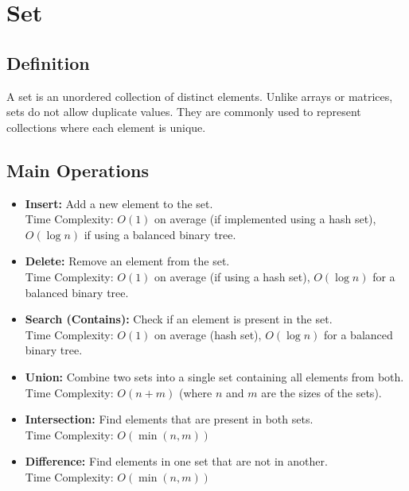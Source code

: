 \documentclass{article}
\begin{document}
\newpage

\section{Set}

\subsection{Definition}
A set is an unordered collection of distinct elements. Unlike arrays or matrices, sets do not allow duplicate values. They are commonly used to represent collections where each element is unique.

\subsection{Main Operations}
\begin{itemize}
    \item \textbf{Insert:} Add a new element to the set.\\
    Time Complexity: $O(1)$ on average (if implemented using a hash set), $O(\log n)$ if using a balanced binary tree.
    
    \item \textbf{Delete:} Remove an element from the set.\\
    Time Complexity: $O(1)$ on average (if using a hash set), $O(\log n)$ for a balanced binary tree.
    
    \item \textbf{Search (Contains):} Check if an element is present in the set.\\
    Time Complexity: $O(1)$ on average (hash set), $O(\log n)$ for a balanced binary tree.
    
    \item \textbf{Union:} Combine two sets into a single set containing all elements from both.\\
    Time Complexity: $O(n + m)$ (where $n$ and $m$ are the sizes of the sets).
    
    \item \textbf{Intersection:} Find elements that are present in both sets.\\
    Time Complexity: $O(\min(n, m))$
    
    \item \textbf{Difference:} Find elements in one set that are not in another.\\
    Time Complexity: $O(\min(n, m))$
\end{itemize}
\end{document}
